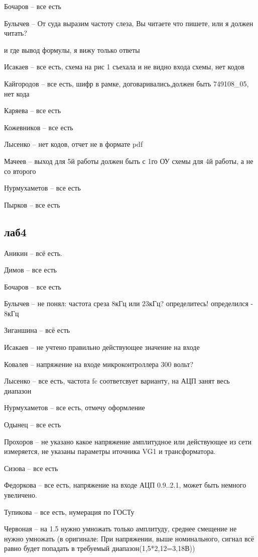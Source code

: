 \documentclass[a4paper,11pt]{article}
\begin{document}
Бочаров -- все есть

Булычев -- От суда выразим частоту слеза, Вы читаете что пишете, или я должен читать?

и где вывод формулы, я вижу только ответы

Исакаев -- все есть, схема на рис 1 съехала и не видно входа схемы, нет кодов

Кайгородов -- все есть, шифр в рамке, договаривались,должен быть 749108\_05, нет кода

Каряева -- все есть

Кожевников -- все есть

Лысенко -- нет кодов, отчет не в формате pdf

Мачеев -- выход для 5й работы должен быть с 1го ОУ схемы для 4й работы, а не со второго 

Нурмухаметов -- все есть

Пырков -- все есть

\newpage
\subsection*{лаб4}
Аникин -- всё есть.

Димов -- все есть

Бочаров -- все есть

Булычев -- не понял: частота среза 8кГц или 23кГц? определитесь! определился - 8кГц

Зиганшина -- всё есть

Исакаев -- не учтено правильно действующее значение на входе

Ковалев -- напряжение на входе микроконтроллера 300 вольт?

Лысенко -- все есть, частота fc соответсвует варианту, на АЦП занят весь диапазон

Нурмухаметов -- все есть, отмечу оформление

Одынец -- все есть

Прохоров -- не указано какое напряжение амплитудное или действующее из сети измеряется, не указаны параметры иточника VG1 и трансформатора.

Сизова -- все есть

Федоркова -- все есть, напряжение на входе АЦП 0.9..2.1, может быть немного увеличено.

Тупикова -- все есть, нумерация по ГОСТу

Червоная -- на 1.5 нужно умножать только амплитуду, среднее смещение не нужно умножать 
(в оригинале: При напряжении, выше номинального, сигнал всё равно будет попадать в требуемый диапазон(1,5*2,12=3,18В))
\end{document}
